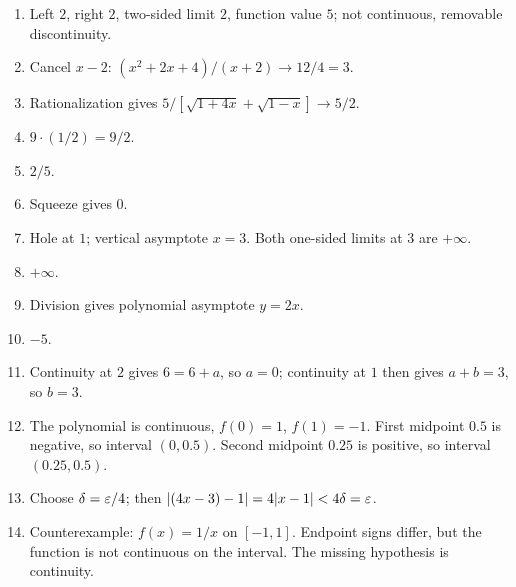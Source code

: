 \begin{enumerate}[label=\textbf{B\arabic*.}]
  \item Left \(2\), right \(2\), two-sided limit \(2\), function value \(5\); not continuous, removable discontinuity.
  \item Cancel \(x-2\): \((x^2+2x+4)/(x+2)\to12/4=3\).
  \item Rationalization gives \(5/[\sqrt{1+4x}+\sqrt{1-x}]\to5/2\).
  \item \(9\cdot(1/2)=9/2\).
  \item \(2/5\).
  \item Squeeze gives \(0\).
  \item Hole at \(1\); vertical asymptote \(x=3\). Both one-sided limits at \(3\) are \(+\infty\).
  \item \(+\infty\).
  \item Division gives polynomial asymptote \(y=2x\).
  \item \(-5\).
  \item Continuity at \(2\) gives \(6=6+a\), so \(a=0\); continuity at \(1\) then gives \(a+b=3\), so \(b=3\).
  \item The polynomial is continuous, \(f(0)=1\), \(f(1)=-1\). First midpoint \(0.5\) is negative, so interval \((0,0.5)\). Second midpoint \(0.25\) is positive, so interval \((0.25,0.5)\).
  \item Choose \(\delta=\varepsilon/4\); then \(|(4x-3)-1|=4|x-1|<4\delta=\varepsilon\).
  \item Counterexample: \(f(x)=1/x\) on \([-1,1]\). Endpoint signs differ, but the function is not continuous on the interval. The missing hypothesis is continuity.
\end{enumerate}
